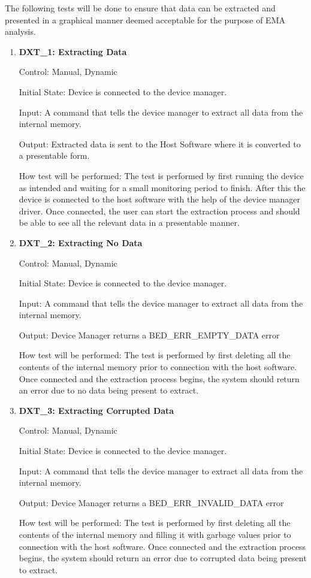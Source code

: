 \documentclass[12pt, titlepage]{article}
\begin{document}
The following tests will be done to ensure that data can be extracted and presented in a graphical manner deemed acceptable for the purpose of EMA analysis.
\begin{enumerate}
	\item{\textbf{DXT\_1: Extracting Data} \\}\label{DXT1}
	
		Control: Manual, Dynamic
							
		Initial State: Device is connected to the device manager.
							
		Input: A command that tells the device manager to extract all data from the internal memory.
		
		Output: Extracted data is sent to the Host Software where it is converted to a presentable form.

		How test will be performed: The test is performed by first running the device as intended and waiting for a small monitoring period to finish. After this the device is connected to the host software with the 				help of the device manager driver. Once connected, the user can start the extraction process and should be able to see all the relevant data in a presentable manner.
		
	\item{\textbf{DXT\_2: Extracting No Data} \\}\label{DXT2}
	
		Control: Manual, Dynamic
							
		Initial State: Device is connected to the device manager.
							
		Input: A command that tells the device manager to extract all data from the internal memory.
		
		Output: Device Manager returns a BED\_ERR\_EMPTY\_DATA error

		How test will be performed: The test is performed by first deleting all the contents of the internal memory prior to connection with the host software. Once connected and the extraction process begins, the 				system should return an error due to no data being present to extract.

	\item{\textbf{DXT\_3: Extracting Corrupted Data} \\}\label{DXT3}
	
		Control: Manual, Dynamic
							
		Initial State: Device is connected to the device manager.
							
		Input: A command that tells the device manager to extract all data from the internal memory.
		
		Output: Device Manager returns a BED\_ERR\_INVALID\_DATA error

		How test will be performed: The test is performed by first deleting all the contents of the internal memory and filling it with garbage values prior to connection with the host software. Once connected and 				the extraction process begins, the system should return an error due to corrupted data being present to extract.
\end{enumerate}
\end{document}
